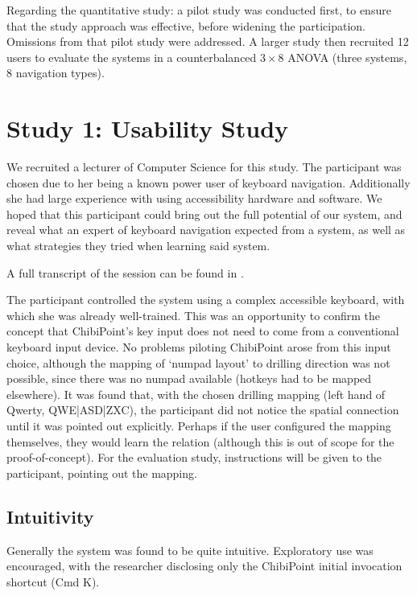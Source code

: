 \documentclass[11pt,openright,a4paper]{report}
\begin{document}
Regarding the quantitative study: a pilot study was conducted first, to ensure that the study approach was effective, before widening the participation. Omissions from that pilot study were addressed.
A larger study then recruited 12 users to evaluate the systems in a counterbalanced $3 \times 8$ ANOVA (three systems, 8 navigation types).

\section{Study 1: Usability Study}
We recruited a lecturer of Computer Science for this study. The participant was chosen due to her being a known power user of keyboard navigation. Additionally she had large experience with using accessibility hardware and software. We hoped that this participant could bring out the full potential of our system, and reveal what an expert of keyboard navigation expected from a system, as well as what strategies they tried when learning said system.

A full transcript of the session can be found in .

The participant controlled the system using a complex accessible keyboard, with which she was already well-trained. This was an opportunity to confirm the concept that ChibiPoint's key input does not need to come from a conventional keyboard input device. No problems piloting ChibiPoint arose from this input choice, although the mapping of `numpad layout' to drilling direction was not possible, since there was no numpad available (hotkeys had to be mapped elsewhere). It was found that, with the chosen drilling mapping (left hand of Qwerty, QWE|ASD|ZXC), the participant did not notice the spatial connection until it was pointed out explicitly. Perhaps if the user configured the mapping themselves, they would learn the relation (although this is out of scope for the proof-of-concept). For the evaluation study, instructions will be given to the participant, pointing out the mapping.

\subsection{Intuitivity}
Generally the system was found to be quite intuitive. Exploratory use was encouraged, with the researcher disclosing only the ChibiPoint initial invocation shortcut (Cmd K).
\end{document}
